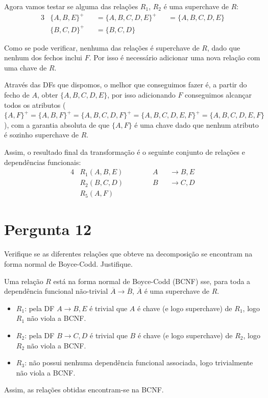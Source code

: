 \documentclass[type=normal, year=2014/15]{bdad_exam}
\begin{document}
{Agora vamos testar se alguma das relações $R_1$, $R_2$ é uma superchave de $R$:
\begin{alignat*}{3}
    & \{A, B, E\}^+ &&= \{A, B, C, D, E\}^+ &&= \{A,B,C,D,E\} \\
    & \{B, C, D\}^+ &&= \{B, C, D\}         &&
\end{alignat*}

Como se pode verificar, nenhuma das relações é superchave de $R$, dado que nenhum dos fechos inclui $F$. Por isso é necessário adicionar uma nova relação com uma chave de $R$.

Através das DFs que dispomos, o melhor que conseguimos fazer é, a partir do fecho de $A$, obter $\{A, B, C, D, E\}$, por isso adicionando $F$ conseguimos alcançar todos os atributos ($\{A,F\}^+ = \{A,B,F\}^+ = \{A,B,C,D,F\}^+ = \{A,B,C,D,E,F\}^+ = \{A,B,C,D,E,F\}$), com a garantia absoluta de que $\{A,F\}$ é uma chave dado que nenhum atributo é sozinho superchave de $R$.

Assim, o resultado final da transformação é o seguinte conjunto de relações e dependências funcionais:
\begin{alignat*}{4}
    & R_1 (A, B, E) &&~~~~&& A && \rightarrow B, E\\
    & R_2 (B, C, D) &&~~~~&& B && \rightarrow C, D\\
    & R_5 (A, F)
\end{alignat*}

\section{Pergunta 12}
Verifique se as diferentes relações que obteve na decomposição se encontram na forma normal de Boyce-Codd. Justifique.

\ansseparator

Uma relação $R$ está na forma normal de Boyce-Codd (BCNF) sse, para toda a dependência funcional não-trivial $\overline{A} \rightarrow \overline{B}$, $\overline{A}$ é uma superchave de $R$.
\begin{itemize}
    \item $R_1$: pela DF $A \rightarrow B, E$ é trivial que $A$ é chave (e logo superchave) de $R_1$, logo $R_1$ não viola a BCNF.
    \item $R_2$: pela DF $B \rightarrow C, D$ é trivial que $B$ é chave (e logo superchave) de $R_2$, logo $R_2$ não viola a BCNF.
    \item $R_3$: não possui nenhuma dependência funcional associada, logo trivialmente não viola a BCNF.
\end{itemize}
Assim, as relações obtidas encontram-se na BCNF.

}
\end{document}
